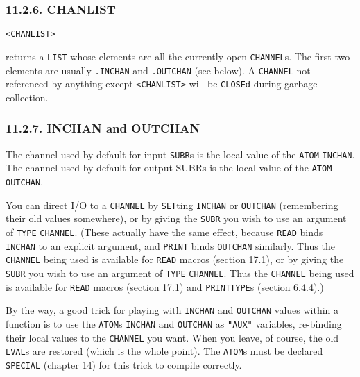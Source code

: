 \documentclass[a4paper,]{article}
\begin{document}
\subsubsection{11.2.6. CHANLIST}\label{chanlist}

\begin{verbatim}
<CHANLIST>
\end{verbatim}

 returns a \texttt{LIST} whose elements are all the currently open \texttt{CHANNEL}s. The
first two elements are usually \texttt{.INCHAN} and \texttt{.OUTCHAN} (see below). A \texttt{CHANNEL}
 not referenced by anything except \texttt{\textless{}CHANLIST\textgreater{}} will be
\texttt{CLOSEd} during garbage collection.

\subsubsection{11.2.7. INCHAN and OUTCHAN}\label{inchan-and-outchan}

The channel used by default for input \texttt{SUBR}s is the local value of the \texttt{ATOM}
\texttt{INCHAN}. The channel used by default for output SUBRs is the local value of the
\texttt{ATOM} \texttt{OUTCHAN}.

You can direct I/O to a \texttt{CHANNEL} by \texttt{SET}ting \texttt{INCHAN} or \texttt{OUTCHAN} (remembering their old
values somewhere), or by giving the \texttt{SUBR} you wish to use an argument of \texttt{TYPE} \texttt{CHANNEL}. (These
actually have the same effect, because \texttt{READ} binds \texttt{INCHAN} to an explicit argument, and \texttt{PRINT}
binds \texttt{OUTCHAN} similarly. Thus the \texttt{CHANNEL} being used is available for \texttt{READ} macros (section
17.1), or by giving the \texttt{SUBR} you wish to use an argument of \texttt{TYPE} \texttt{CHANNEL}. Thus the
\texttt{CHANNEL} being used is available for \texttt{READ} macros (section 17.1) and \texttt{PRINTTYPE}s (section 6.4.4).)

By the way, a good trick for playing with \texttt{INCHAN} and \texttt{OUTCHAN} values within a function is to use the
\texttt{ATOM}s \texttt{INCHAN} and \texttt{OUTCHAN} as \texttt{"AUX"}  variables, re-binding their
local values to the \texttt{CHANNEL} you want. When you leave, of course, the old \texttt{LVAL}s are restored (which is the
whole point). The \texttt{ATOM}s must be declared \texttt{SPECIAL} (chapter 14) for this trick to compile correctly.
\end{document}
